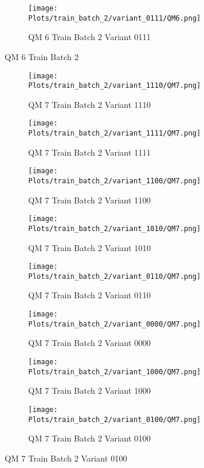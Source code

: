 \documentclass{DissertateFigs}
\begin{document}
\begin{figure}[t!]
\medskip

    \begin{subfigure}{0.47\textwidth}
    \texttt{[image: Plots/train\_batch\_2/variant\_0111/QM6.png]}
    \caption{QM 6 Train Batch 2 Variant 0111}
    \end{subfigure}
\caption{QM 6 Train Batch 2}
    \end{figure}
\clearpage
\begin{figure}[t!]
    \begin{subfigure}{0.47\textwidth}
    \texttt{[image: Plots/train\_batch\_2/variant\_1110/QM7.png]}
    \caption{QM 7 Train Batch 2 Variant 1110}
    \end{subfigure}
    \begin{subfigure}{0.47\textwidth}
    \texttt{[image: Plots/train\_batch\_2/variant\_1111/QM7.png]}
    \caption{QM 7 Train Batch 2 Variant 1111}
    \end{subfigure}

\medskip

    \begin{subfigure}{0.47\textwidth}
    \texttt{[image: Plots/train\_batch\_2/variant\_1100/QM7.png]}
    \caption{QM 7 Train Batch 2 Variant 1100}
    \end{subfigure}
    \begin{subfigure}{0.47\textwidth}
    \texttt{[image: Plots/train\_batch\_2/variant\_1010/QM7.png]}
    \caption{QM 7 Train Batch 2 Variant 1010}
    \end{subfigure}

\medskip

    \begin{subfigure}{0.47\textwidth}
    \texttt{[image: Plots/train\_batch\_2/variant\_0110/QM7.png]}
    \caption{QM 7 Train Batch 2 Variant 0110}
    \end{subfigure}
    \begin{subfigure}{0.47\textwidth}
    \texttt{[image: Plots/train\_batch\_2/variant\_0000/QM7.png]}
    \caption{QM 7 Train Batch 2 Variant 0000}
    \end{subfigure}

\medskip

    \begin{subfigure}{0.47\textwidth}
    \texttt{[image: Plots/train\_batch\_2/variant\_1000/QM7.png]}
    \caption{QM 7 Train Batch 2 Variant 1000}
    \end{subfigure}
    \begin{subfigure}{0.47\textwidth}
    \texttt{[image: Plots/train\_batch\_2/variant\_0100/QM7.png]}
    \caption{QM 7 Train Batch 2 Variant 0100}
    \end{subfigure}


\end{figure}
\end{document}
